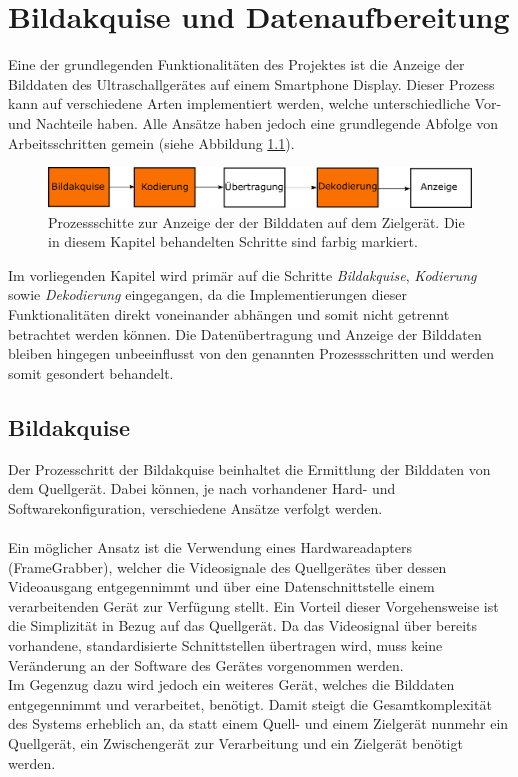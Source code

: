 \chapter{Bildakquise und Datenaufbereitung}
Eine der grundlegenden Funktionalitäten des Projektes ist die Anzeige der Bilddaten des Ultraschallgerätes auf einem Smartphone Display. Dieser Prozess kann auf verschiedene Arten implementiert werden, welche unterschiedliche Vor- und Nachteile haben. Alle Ansätze haben jedoch eine grundlegende Abfolge von Arbeitsschritten gemein (siehe Abbildung \ref{fig:Bildakquise_schritte}).\\

\begin{figure}[h]
	\centering
	\includegraphics[width=1\textwidth]{Bilder/BildakquiseUndDatenaufbereitung/Bildakquise_schritte.pdf}
	\caption{Prozessschitte zur Anzeige der der Bilddaten auf dem Zielgerät. Die in diesem Kapitel behandelten Schritte sind farbig markiert.}
	\label{fig:Bildakquise_schritte}
\end{figure}

Im vorliegenden Kapitel wird primär auf die Schritte \textit{Bildakquise}, \textit{Kodierung} sowie \textit{Dekodierung} eingegangen, da die Implementierungen dieser Funktionalitäten direkt voneinander abhängen und somit nicht getrennt betrachtet werden können. Die Datenübertragung und Anzeige der Bilddaten bleiben hingegen unbeeinflusst von den genannten Prozessschritten und werden somit gesondert behandelt.\\

\section{Bildakquise}
Der Prozesschritt der Bildakquise beinhaltet die Ermittlung der Bilddaten von dem Quellgerät. Dabei können, je nach vorhandener Hard- und Softwarekonfiguration, verschiedene Ansätze verfolgt werden.\\
\\
Ein möglicher Ansatz ist die Verwendung eines Hardwareadapters (\glqq FrameGrabber\grqq), welcher die Videosignale des Quellgerätes über dessen Videoausgang entgegennimmt und über eine Datenschnittstelle einem verarbeitenden Gerät zur Verfügung stellt. Ein Vorteil dieser Vorgehensweise ist die Simplizität in Bezug auf das Quellgerät. Da das Videosignal über bereits vorhandene, standardisierte Schnittstellen übertragen wird, muss keine Veränderung an der Software des Gerätes vorgenommen werden.\\
Im Gegenzug dazu wird jedoch ein weiteres Gerät, welches die Bilddaten entgegennimmt und verarbeitet, benötigt. Damit steigt die Gesamtkomplexität des Systems erheblich an, da statt einem Quell- und einem Zielgerät nunmehr ein Quellgerät, ein Zwischengerät zur Verarbeitung und ein Zielgerät benötigt werden.\\

